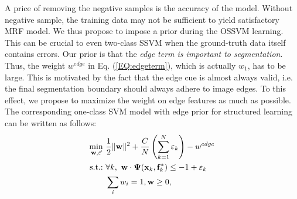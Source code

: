\documentclass[10pt,journal,compsoc]{newIEEEtran}
\begin{document}
 A price of removing the negative samples is the accuracy of the model. Without negative sample, the training data may not be sufficient to yield satisfactory MRF model. We thus propose to impose a prior during the OSSVM learning. This can be crucial to even two-class SSVM when the ground-truth data itself contains errors. Our prior is that the \emph{edge term is important to segmentation}. Thus, the weight $w^{edge}$ in Eq. (\ref{EQ:edgeterm}), which is actually $w_1$, has to be large. This is motivated by the fact that the edge cue is almost always valid, i.e. the final segmentation boundary should always adhere to image edges. To this effect, we propose to maximize the weight on edge features as much as possible. The corresponding one-class SVM model with edge prior for structured learning can be written as follows:
\begin{equation}\label{EQ:OSSVM_wp}
\begin{split}
\min_{\mathbf{w},\vec{\varepsilon}}~& {1\over2}\|\mathbf{w}\|^2 + {C\over N}\left(\sum_{k=1}^N \varepsilon_k\right) - w^{edge} \\
\hbox{s.t.:}~&  \forall k,~ \mathbf{w}\cdot\mathbf{\Psi}(\mathbf{x}_k,\mathbf{f}^*_k)\leq -1+\varepsilon_k \\            
             &  \sum_i w_i=1, \mathbf{w}\geq 0, \\
\end{split}
\end{equation}%
\end{document}
